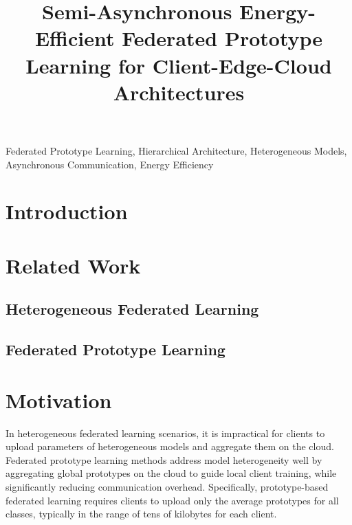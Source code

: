 \documentclass[journal]{IEEEtran}
\begin{document}
\title{Semi-Asynchronous Energy-Efficient Federated Prototype Learning for Client-Edge-Cloud Architectures}




\maketitle

\begin{abstract}

\end{abstract}

\begin{IEEEkeywords}
  Federated Prototype Learning, Hierarchical Architecture, Heterogeneous Models, Asynchronous Communication, Energy Efficiency
\end{IEEEkeywords}

\section{Introduction}

\section{Related Work}
\subsection{Heterogeneous Federated Learning}
\subsection{Federated Prototype Learning}

\section{Motivation}
In heterogeneous federated learning scenarios, it is impractical for clients to upload parameters of heterogeneous models and aggregate them on the cloud. Federated prototype learning methods address model heterogeneity well by aggregating global prototypes on the cloud to guide local client training, while significantly reducing communication overhead. Specifically, prototype-based federated learning requires clients to upload only the average prototypes for all classes, typically in the range of tens of kilobytes for each client. 
\end{document}
